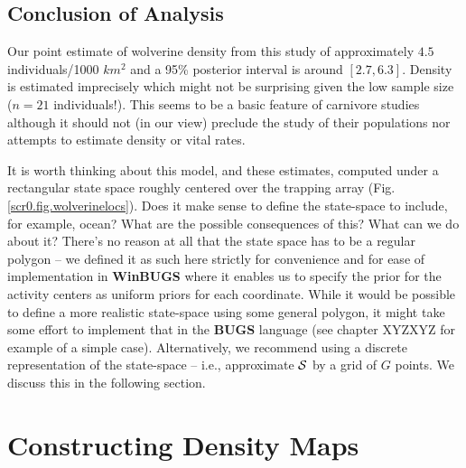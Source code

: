 \subsection{Conclusion of Analysis}

Our point estimate of wolverine density from this study of
approximately $4.5$ individuals/1000 $km^2$ and a 95\% posterior
interval is around $[2.7, 6.3]$. Density is estimated imprecisely
which might not be surprising given the low sample size ($n=21$
individuals!). This seems to be a basic feature of carnivore studies
although it should not (in our view) preclude the study of their
populations nor attempts to estimate density or vital rates.

It is worth thinking about this model, and these estimates, computed
under a rectangular state space roughly centered over the trapping
array (Fig. \ref{scr0.fig.wolverinelocs}).
Does it make sense to define the state-space to
include, for example, ocean? What are the possible consequences of
this? What can we do about it?  There's no reason at all that the
state space has to be a regular polygon -- we defined it as such here
strictly for convenience and for ease of implementation in {\bf WinBUGS}
where it enables us to specify the prior for the activity centers as
uniform priors for each coordinate.  While it would be possible to
define a more realistic state-space using some general polygon, it
might take some effort to implement that in the {\bf BUGS} language (see
chapter XYZXYZ for example of a simple case). Alternatively, we recommend
using a discrete representation of the state-space -- i.e., approximate
${\cal S}$ by a grid of $G$ points. We discuss this in the following
section.

\section{Constructing Density Maps}
\label{scr0.sec.mapping}

